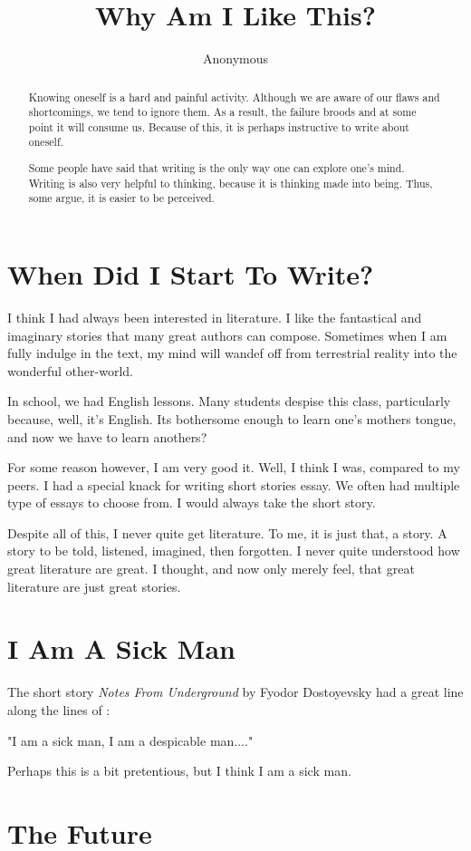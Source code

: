 \documentclass{article}
\title{Why Am I Like This?}
\author{Anonymous}
\begin{document}
\maketitle

\begin{abstract}
    Knowing oneself is a hard and painful activity.
    Although we are aware of our flaws and shortcomings, we tend to ignore them.
    As a result, the failure broods and at some point it will consume us.
    Because of this, it is perhaps instructive to write about oneself.
    
    Some people have said that writing is the only way one can explore one's mind.
    Writing is also very helpful to thinking, because it is thinking made into being.
    Thus, some argue, it is easier to be perceived.
\end{abstract}

\section{When Did I Start To Write?}

I think I had always been interested in literature.
I like the fantastical and imaginary stories that many great authors can compose.
Sometimes when I am fully indulge in the text, my mind will wandef off from terrestrial reality into the wonderful other-world.

In school, we had English lessons.
Many students despise this class, particularly because, well, it's English.
Its bothersome enough to learn one's mothers tongue, and now we have to learn anothers?

For some reason however, I am very good it.
Well, I think I was, compared to my peers.
I had a special knack for writing short stories essay.
We often had multiple type of essays to choose from.
I would always take the short story.

Despite all of this, I never quite get literature.
To me, it is just that, a story.
A story to be told, listened, imagined, then forgotten.
I never quite understood how great literature are great.
I thought, and now only merely feel, that great literature are just great stories.

\section{I Am A Sick Man}

The short story \textit{Notes From Underground} by Fyodor Dostoyevsky had a great line along the lines of :

"I am a sick man, I am a despicable man...."

Perhaps this is a bit pretentious, but I think I am a sick man.

\section{The Future}
\end{document}
